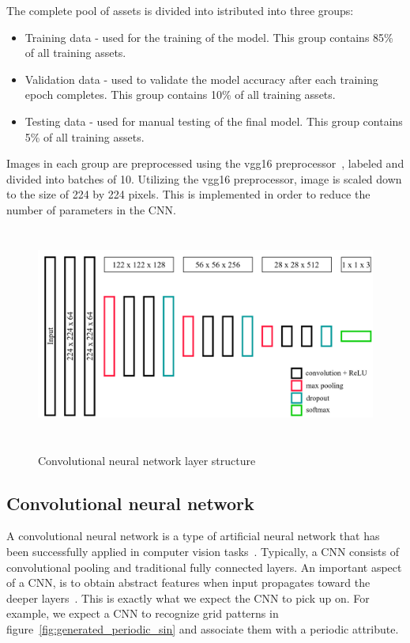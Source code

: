 \documentclass[a4paper,12pt,fleqn]{article}
\begin{document}
The complete pool of assets is divided into istributed into three groups: 
\begin{itemize}
  \item Training data - used for the training of the model. This group contains 85\% of all training assets.
  \item Validation data - used to validate the model accuracy after each training epoch completes. This group contains 10\% of all training assets.
  \item Testing data - used for manual testing of the final model. This group contains 5\% of all training assets.
\end{itemize}
Images in each group are preprocessed using the vgg16 preprocessor~\cite{brusilovsky:simonyan2014very}, labeled and divided into 
batches of 10.
Utilizing the vgg16 preprocessor, image is scaled down to the size of 224 by 224 pixels.
This is implemented in order to reduce the number of parameters in the CNN.


\begin{figure}[h]
  \centering
  {\includegraphics[height=7cm]{assets/cnn_layers.png}}
  \caption{Convolutional neural network layer structure}
  \label{fig:cnn_layers}
\end{figure}


\subsection{Convolutional neural network}
A convolutional neural network is a type of artificial neural network that has been successfully applied in computer vision tasks~\cite{recent_advances_in_cnn}. 
Typically, a CNN consists of convolutional pooling and traditional fully connected layers.
An important aspect of a CNN, is to obtain abstract features when input propagates toward the deeper layers~\cite{understanding_cnn}.
This is exactly what we expect the CNN to pick up on.
For example, we expect a CNN to recognize grid patterns in figure~\ref{fig:generated_periodic_sin} and associate them with a periodic attribute.
\end{document}
